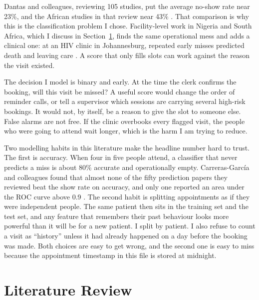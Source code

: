 \documentclass[conference]{IEEEtran}
\begin{document}
Dantas and colleagues, reviewing 105 studies, put the average no-show rate near 23\%, and the African studies in that review near 43\% \cite{dantas2018}. That comparison is why this is the classification problem I chose. Facility-level work in Nigeria and South Africa, which I discuss in Section~\ref{sec:lit}, finds the same operational mess and adds a clinical one: at an HIV clinic in Johannesburg, repeated early misses predicted death and leaving care \cite{brennan2010}. A score that only fills slots can work against the reason the visit existed.

The decision I model is binary and early. At the time the clerk confirms the booking, will this visit be missed? A useful score would change the order of reminder calls, or tell a supervisor which sessions are carrying several high-risk bookings. It would not, by itself, be a reason to give the slot to someone else. False alarms are not free. If the clinic overbooks every flagged visit, the people who were going to attend wait longer, which is the harm I am trying to reduce.

Two modelling habits in this literature make the headline number hard to trust. The first is accuracy. When four in five people attend, a classifier that never predicts a miss is about 80\% accurate and operationally empty. Carreras-Garc\'{i}a and colleagues found that almost none of the fifty prediction papers they reviewed beat the show rate on accuracy, and only one reported an area under the ROC curve above 0.9 \cite{carreras2020}. The second habit is splitting appointments as if they were independent people. The same patient then sits in the training set and the test set, and any feature that remembers their past behaviour looks more powerful than it will be for a new patient. I split by patient. I also refuse to count a visit as ``history'' unless it had already happened on a day before the booking was made. Both choices are easy to get wrong, and the second one is easy to miss because the appointment timestamp in this file is stored at midnight.

\section{Literature Review}
\label{sec:lit}
\end{document}
